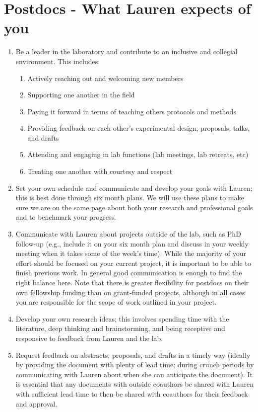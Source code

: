 \documentclass[12pt]{article}
\begin{document}
\section{Postdocs - What Lauren expects of you}
\begin{enumerate}
\item Be a leader in the laboratory and contribute to an inclusive and collegial environment. This includes:
\begin{enumerate}
\item Actively reaching out and welcoming new members
\item Supporting one another in the field 
\item Paying it forward in terms of teaching others protocols and methods
\item Providing feedback on each other's experimental design, proposals, talks, and drafts
\item Attending and engaging in lab functions (lab meetings, lab retreats, etc) 
\item Treating one another with courtesy and respect
\end{enumerate}

\item Set your own schedule and communicate and develop your goals with Lauren; this is best done through six month plans. We will use these plans to make sure we are on the same page about both your research and professional goals and to benchmark your progress.

\item Communicate with Lauren about projects outside of the lab, such as PhD follow-up (e.g., include it on your six month plan and discuss in your weekly meeting when it takes some of the week's time). While the majority of your effort should be focused on your current project, it is important to be able to finish previous work. In general good communication is enough to find the right balance here. Note that there is greater flexibility for postdocs on their own fellowship funding than on grant-funded projects, although in all cases you are responsible for the scope of work outlined in your project.

\item Develop your own research ideas; this involves spending time with the literature, deep thinking and brainstorming, and being receptive and responsive to feedback from Lauren and the lab.

\item Request feedback on abstracts, proposals, and drafts in a timely way (ideally by providing the document with plenty of lead time; during crunch periods by communicating with Lauren about when she can anticipate the document). It is essential that any documents with outside coauthors be shared with Lauren with sufficient lead time to then be shared with coauthors for their feedback and approval.


\end{enumerate}
\end{document}
